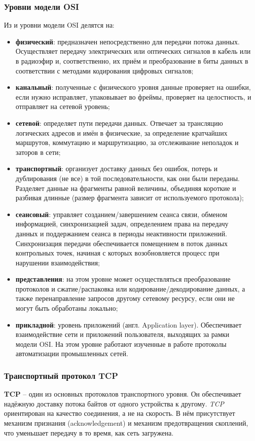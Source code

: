 \subsubsection{Уровни модели OSI}
Из  и \cite{kumar_survey_2012} уровни модели OSI делятся на:
\begin{itemize}
	\item \textbf{физический}: предназначен непосредственно для передачи потока данных. Осуществляет передачу электрических или оптических сигналов в кабель или в радиоэфир и, соответственно, их приём и преобразование в биты данных в соответствии с методами кодирования цифровых сигналов;
	\item \textbf{канальный}: полученные с физического уровня данные проверяет на ошибки, если нужно исправляет, упаковывает во фреймы, проверяет на целостность, и отправляет на сетевой уровень;
	\item \textbf{сетевой}: определяет пути передачи данных. Отвечает за трансляцию логических адресов и имён в физические, за определение кратчайших маршрутов, коммутацию и маршрутизацию, за отслеживание неполадок и заторов в сети;
	\item \textbf{транспортный}: организует доставку данных без ошибок, потерь и дублирования (не все) в той последовательности, как они были переданы. Разделяет данные на фрагменты равной величины, объединяя короткие и разбивая длинные (размер фрагмента зависит от используемого протокола);
	\item \textbf{сеансовый}: управляет созданием/завершением сеанса связи, обменом информацией, синхронизацией задач, определением права на передачу данных и поддержанием сеанса в периоды неактивности приложений. Синхронизация передачи обеспечивается помещением в поток данных контрольных точек, начиная с которых возобновляется процесс при нарушении взаимодействия;
	\item \textbf{представления}: на этом уровне может осуществляться преобразование протоколов и сжатие/распаковка или кодирование/декодирование данных, а также перенаправление запросов другому сетевому ресурсу, если они не могут быть обработаны локально;
	\item \textbf{прикладной}: уровень приложений (англ. Application layer). Обеспечивает взаимодействие сети и приложений пользователя, выходящих за рамки модели OSI. На этом уровне работают изученные в работе протоколы автоматизации промышленных сетей.
\end{itemize}
\subsubsection{Транспортный протокол TCP}
\textbf{TCP} \cite{noergaard_chapter_2010} -- один из основных протоколов транспортного уровня. Он обеспечивает надёжную доставку потока байтов от одного устройства к другому. \textit{TCP} ориентирован на качество соединения, а не на скорость. В нём присутствует механизм признания (acknowledgement) и механизм предотвращения скоплений, что уменьшает передачу в то время, как сеть загружена. 

